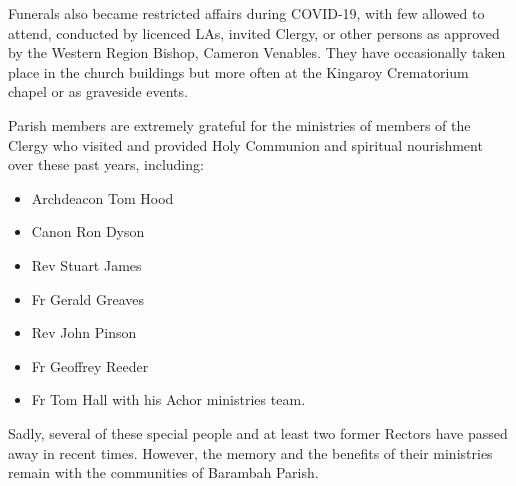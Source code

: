 Funerals also became restricted affairs during COVID-19, with few allowed to attend, conducted by licenced LAs, invited Clergy, or other persons as approved by the Western Region Bishop, Cameron Venables. They have occasionally taken place in the church buildings but more often at the Kingaroy Crematorium chapel or as graveside events.



Parish members are extremely grateful for the ministries of members of the Clergy who visited and provided Holy Communion and spiritual nourishment over these past years, including:



\begin{itemize}

\item

  Archdeacon Tom Hood

\item

  Canon Ron Dyson

\item

  Rev Stuart James

\item

  Fr Gerald Greaves

\item

  Rev John Pinson

\item

  Fr Geoffrey Reeder

\item

  Fr Tom Hall with his Achor ministries team\emph{.}

\end{itemize}



Sadly, several of these special people and at least two former Rectors have passed away in recent times. However, the memory and the benefits of their ministries remain with the communities of Barambah Parish.



\balance


